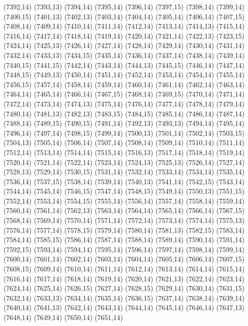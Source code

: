 (7392,14)
(7393,13)
(7394,14)
(7395,14)
(7396,14)
(7397,15)
(7398,14)
(7399,14)
(7400,15)
(7401,13)
(7402,13)
(7403,14)
(7404,14)
(7405,14)
(7406,14)
(7407,15)
(7408,14)
(7409,14)
(7410,14)
(7411,14)
(7412,14)
(7413,14)
(7414,13)
(7415,14)
(7416,14)
(7417,14)
(7418,14)
(7419,14)
(7420,14)
(7421,14)
(7422,13)
(7423,15)
(7424,14)
(7425,13)
(7426,14)
(7427,14)
(7428,14)
(7429,14)
(7430,14)
(7431,14)
(7432,14)
(7433,13)
(7434,15)
(7435,14)
(7436,14)
(7437,14)
(7438,14)
(7439,14)
(7440,15)
(7441,15)
(7442,14)
(7443,14)
(7444,13)
(7445,15)
(7446,14)
(7447,14)
(7448,15)
(7449,13)
(7450,14)
(7451,14)
(7452,14)
(7453,14)
(7454,14)
(7455,14)
(7456,15)
(7457,14)
(7458,14)
(7459,14)
(7460,14)
(7461,14)
(7462,14)
(7463,14)
(7464,14)
(7465,14)
(7466,14)
(7467,15)
(7468,14)
(7469,15)
(7470,14)
(7471,14)
(7472,14)
(7473,14)
(7474,13)
(7475,14)
(7476,14)
(7477,14)
(7478,14)
(7479,14)
(7480,14)
(7481,13)
(7482,13)
(7483,15)
(7484,15)
(7485,14)
(7486,14)
(7487,14)
(7488,14)
(7489,15)
(7490,15)
(7491,14)
(7492,13)
(7493,13)
(7494,14)
(7495,14)
(7496,14)
(7497,14)
(7498,15)
(7499,14)
(7500,13)
(7501,14)
(7502,14)
(7503,15)
(7504,13)
(7505,14)
(7506,14)
(7507,14)
(7508,14)
(7509,14)
(7510,14)
(7511,14)
(7512,14)
(7513,14)
(7514,14)
(7515,14)
(7516,13)
(7517,14)
(7518,14)
(7519,14)
(7520,14)
(7521,14)
(7522,14)
(7523,14)
(7524,13)
(7525,13)
(7526,14)
(7527,14)
(7528,13)
(7529,14)
(7530,15)
(7531,14)
(7532,14)
(7533,14)
(7534,14)
(7535,14)
(7536,14)
(7537,15)
(7538,14)
(7539,14)
(7540,13)
(7541,14)
(7542,15)
(7543,14)
(7544,14)
(7545,14)
(7546,15)
(7547,14)
(7548,15)
(7549,14)
(7550,13)
(7551,15)
(7552,14)
(7553,14)
(7554,15)
(7555,14)
(7556,14)
(7557,14)
(7558,14)
(7559,14)
(7560,14)
(7561,14)
(7562,13)
(7563,14)
(7564,14)
(7565,14)
(7566,14)
(7567,15)
(7568,14)
(7569,14)
(7570,14)
(7571,14)
(7572,14)
(7573,14)
(7574,14)
(7575,13)
(7576,14)
(7577,14)
(7578,15)
(7579,14)
(7580,14)
(7581,13)
(7582,15)
(7583,14)
(7584,14)
(7585,15)
(7586,14)
(7587,14)
(7588,14)
(7589,14)
(7590,14)
(7591,14)
(7592,15)
(7593,14)
(7594,14)
(7595,14)
(7596,14)
(7597,14)
(7598,14)
(7599,14)
(7600,14)
(7601,14)
(7602,14)
(7603,14)
(7604,14)
(7605,14)
(7606,14)
(7607,15)
(7608,15)
(7609,14)
(7610,14)
(7611,14)
(7612,14)
(7613,14)
(7614,14)
(7615,14)
(7616,14)
(7617,14)
(7618,14)
(7619,14)
(7620,14)
(7621,13)
(7622,14)
(7623,14)
(7624,14)
(7625,14)
(7626,15)
(7627,14)
(7628,15)
(7629,14)
(7630,14)
(7631,15)
(7632,14)
(7633,13)
(7634,14)
(7635,14)
(7636,15)
(7637,14)
(7638,14)
(7639,14)
(7640,14)
(7641,13)
(7642,14)
(7643,14)
(7644,14)
(7645,14)
(7646,14)
(7647,13)
(7648,14)
(7649,14)
(7650,14)
(7651,14)

